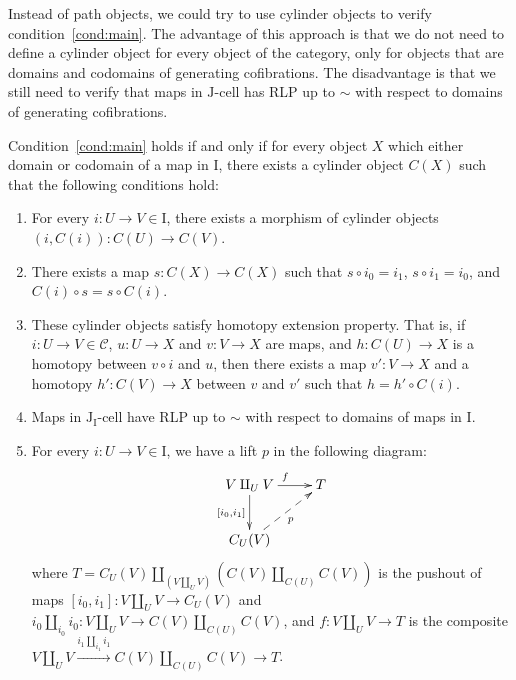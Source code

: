 \documentclass[reqno]{amsart}
\theoremstyle{definition}
\newcommand{\cof}{\mathcal{C}}
\newcommand{\I}{\mathrm{I}}
\newcommand{\J}{\mathrm{J}}
\newcommand{\class}[2]{#1\text{-}\mathrm{#2}}
\newcommand{\Icell}[1][\I]{\class{#1}{cell}}
\newcommand{\Jcell}[1][]{\Icell[\J#1]}
\newcommand{\cyli}{i}
\begin{document}
Instead of path objects, we could try to use cylinder objects to verify condition~\eqref{cond:main}.
The advantage of this approach is that we do not need to define a cylinder object for every object of the category,
only for objects that are domains and codomains of generating cofibrations.
The disadvantage is that we still need to verify that maps in $\Jcell$ has RLP up to $\sim$ with respect to domains of generating cofibrations.

\begin{prop}
Condition~\eqref{cond:main} holds if and only if for every object $X$ which either domain or codomain of a map in $\I$,
there exists a cylinder object $C(X)$ such that the following conditions hold:
\begin{enumerate}
\item For every $i : U \to V \in \I$, there exists a morphism of cylinder objects $(i,C(i)) : C(U) \to C(V)$.
\item There exists a map $s : C(X) \to C(X)$ such that $s \circ i_0 = i_1$, $s \circ i_1 = i_0$, and $C(i) \circ s = s \circ C(i)$.
\item These cylinder objects satisfy homotopy extension property. That is,
if $i : U \to V \in \cof$, $u : U \to X$ and $v : V \to X$ are maps, and $h : C(U) \to X$ is a homotopy between $v \circ i$ and $u$,
then there exists a map $v' : V \to X$ and a homotopy $h' : C(V) \to X$ between $v$ and $v'$ such that $h = h' \circ C(i)$.
\item Maps in $\Jcell[_\I]$ have RLP up to $\sim$ with respect to domains of maps in $\I$.
\item For every $i : U \to V \in \I$, we have a lift $p$ in the following diagram:
\[ \xymatrix{ V \amalg_U V \ar[r]^f \ar[d]_{[\cyli_0,\cyli_1]} & T \\
              C_U(V) \ar@{-->}[ur]_p
            } \]
where $T = C_U(V) \amalg_{(V \amalg_U V)} (C(V) \amalg_{C(U)} C(V))$ is the pushout of maps $[\cyli_0,\cyli_1] : V \amalg_U V \to C_U(V)$
and $\cyli_0 \amalg_{\cyli_0} \cyli_0 : V \amalg_U V \to C(V) \amalg_{C(U)} C(V)$,
and $f : V \amalg_U V \to T$ is the composite $V \amalg_U V \xrightarrow{\cyli_1 \amalg_{\cyli_1} \cyli_1} C(V) \amalg_{C(U)} C(V) \to T$.
\end{enumerate}
\end{prop}
\end{document}
